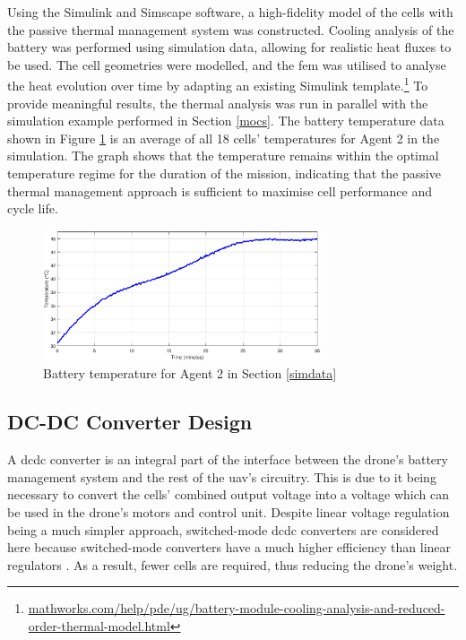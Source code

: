 Using the Simulink and Simscape software, a high-fidelity model of the cells with the passive thermal management system was constructed. Cooling analysis of the battery was performed using simulation data, allowing for realistic heat fluxes to be used. The cell geometries were modelled, and the \gls{fem} was utilised to analyse the heat evolution over time by adapting an existing Simulink template.\footnote{\hyperlink{https://mathworks.com/help/pde/ug/battery-module-cooling-analysis-and-reduced-order-thermal-model.html}{mathworks.com/help/pde/ug/battery-module-cooling-analysis-and-reduced-order-thermal-model.html}} To provide meaningful results, the thermal analysis was run in parallel with the simulation example performed in Section \ref{mocs}. The battery temperature data shown in Figure \ref{fig:battemp} is an average of all 18 cells' temperatures for Agent 2 in the simulation. The graph shows that the temperature remains within the optimal temperature regime for the duration of the mission, indicating that the passive thermal management approach is sufficient to maximise cell performance and cycle life.

\begin{figure}[H]
\centering
\includegraphics[width=0.73\textwidth]{figs/Samuel/Figures/batttemp.eps}
\caption{Battery temperature for Agent 2 in Section \ref{simdata}}
\label{fig:battemp}
\end{figure}

\subsection{DC-DC Converter Design}

A \acrshort{dcdc} converter is an integral part of the interface between the drone's battery management system and the rest of the \acrshort{uav}'s circuitry. This is due to it being necessary to convert the cells' combined output voltage into a voltage which can be used in the drone's motors and control unit. Despite linear voltage regulation being a much simpler approach, switched-mode \acrshort{dcdc} converters are considered here because switched-mode converters have a much higher efficiency than linear regulators \cite{rogers2024powerelectronics}. As a result, fewer cells are required, thus reducing the drone's weight.

